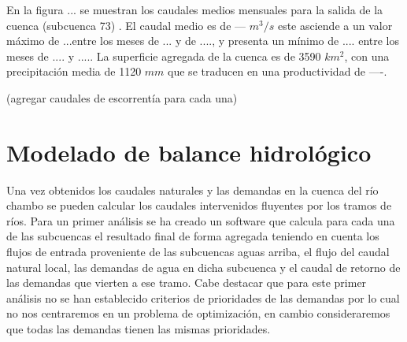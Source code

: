 En la figura ... se muestran los caudales medios mensuales
para la salida de la cuenca (subcuenca 73) . El caudal medio es de --- $m^3/s$ 
este asciende a un valor máximo de ...entre los meses de ... y de ...., y presenta un mínimo de .... entre los meses de ....
y ..... La superficie agregada de la cuenca es de 3590 $km^2$, con una precipitación media de 1120 $mm$ que se traducen en una 
productividad de ----.

\textcolor{codegreen}{(agregar caudales de escorrentía para cada una)}
  



\section{Modelado de balance hidrológico}
\label{Modelo_balance}

Una vez obtenidos los caudales naturales y las demandas en la cuenca del río chambo se pueden calcular los caudales intervenidos
fluyentes por los tramos de ríos. Para un primer análisis se ha creado un software que calcula para cada una de las subcuencas
el resultado final de forma agregada teniendo en cuenta los flujos de entrada proveniente de las subcuencas aguas arriba, 
el flujo del caudal natural local, las demandas de agua en dicha subcuenca y  el caudal de retorno de las demandas que vierten a ese tramo.
Cabe destacar que para este primer análisis no se han establecido criterios de prioridades de las demandas por lo cual 
no nos centraremos en un problema de optimización, en cambio consideraremos que todas las demandas tienen las mismas 
prioridades.


